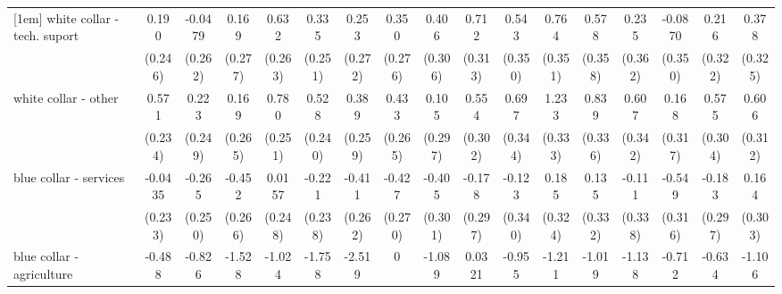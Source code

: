 {\begin{tabular}{l*{16}{c}}
[1em]
white collar - tech. suport&       0.190         &     -0.0479         &       0.169         &       0.632\sym{*}  &       0.335         &       0.253         &       0.350         &       0.406         &       0.712\sym{*}  &       0.543         &       0.764\sym{*}  &       0.578         &       0.235         &     -0.0870         &       0.216         &       0.378         \\
                    &     (0.246)         &     (0.262)         &     (0.277)         &     (0.263)         &     (0.251)         &     (0.272)         &     (0.276)         &     (0.306)         &     (0.313)         &     (0.350)         &     (0.351)         &     (0.358)         &     (0.362)         &     (0.350)         &     (0.322)         &     (0.325)         \\
[1em]
white collar - other&       0.571\sym{*}  &       0.223         &       0.169         &       0.780\sym{**} &       0.528\sym{*}  &       0.389         &       0.433         &       0.105         &       0.554         &       0.697\sym{*}  &       1.233\sym{***}&       0.839\sym{*}  &       0.607         &       0.168         &       0.575         &       0.606         \\
                    &     (0.234)         &     (0.249)         &     (0.265)         &     (0.251)         &     (0.240)         &     (0.259)         &     (0.265)         &     (0.297)         &     (0.302)         &     (0.344)         &     (0.333)         &     (0.336)         &     (0.342)         &     (0.317)         &     (0.304)         &     (0.312)         \\
[1em]
blue collar - services&     -0.0435         &      -0.265         &      -0.452         &      0.0157         &      -0.221         &      -0.411         &      -0.427         &      -0.405         &      -0.178         &      -0.123         &       0.185         &       0.135         &      -0.111         &      -0.549         &      -0.183         &       0.164         \\
                    &     (0.233)         &     (0.250)         &     (0.266)         &     (0.248)         &     (0.238)         &     (0.262)         &     (0.270)         &     (0.301)         &     (0.297)         &     (0.340)         &     (0.324)         &     (0.332)         &     (0.338)         &     (0.316)         &     (0.297)         &     (0.303)         \\
[1em]
blue collar - agriculture&      -0.488         &      -0.826         &      -1.528\sym{*}  &      -1.024         &      -1.758\sym{*}  &      -2.519\sym{*}  &           0         &      -1.089         &      0.0321         &      -0.955         &      -1.211         &      -1.019         &      -1.138         &      -0.712         &      -0.634         &      -1.106         \\

\end{tabular}}
